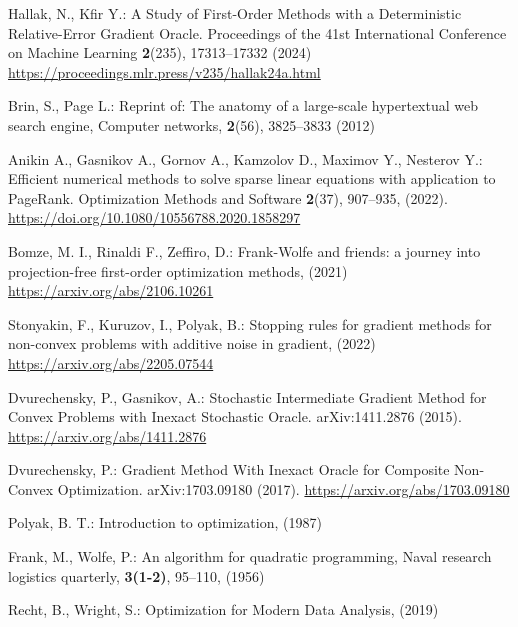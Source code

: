 \documentclass[runningheads, final]{llncs}
\begin{document}
%
%
%
% 
% 
%
\begin{thebibliography}{8}
    Hallak, N., Kfir Y.: A Study of First-Order Methods with a Deterministic Relative-Error Gradient Oracle. Proceedings of the 41st International
    Conference on Machine Learning \textbf{2}(235), 17313--17332 (2024)
    \url{https://proceedings.mlr.press/v235/hallak24a.html}

    Brin, S., Page L.: Reprint of: The anatomy of a large-scale hypertextual
    web search engine, Computer networks, \textbf{2}(56), 3825--3833 (2012)

    Anikin A., Gasnikov A., Gornov A., Kamzolov D., Maximov Y., Nesterov Y.: Efficient numerical methods to solve sparse linear equations
    with application to PageRank. Optimization Methods and Software
    \textbf{2}(37), 907--935, (2022).
    \url{https://doi.org/10.1080/10556788.2020.1858297}

    Bomze, M. I., Rinaldi F., Zeffiro, D.: Frank-Wolfe and friends: a journey
    into projection-free first-order optimization methods, (2021)
    \url{https://arxiv.org/abs/2106.10261}

    Stonyakin, F., Kuruzov, I., Polyak, B.: Stopping rules for gradient methods
    for non-convex problems with additive noise in gradient, (2022)
    \url{https://arxiv.org/abs/2205.07544}

    Dvurechensky, P., Gasnikov, A.: Stochastic Intermediate Gradient Method for
    Convex Problems with Inexact Stochastic Oracle.
    arXiv:1411.2876 (2015). \url{https://arxiv.org/abs/1411.2876}

    Dvurechensky, P.: Gradient Method With Inexact Oracle for Composite
    Non-Convex Optimization.
    arXiv:1703.09180 (2017). \url{https://arxiv.org/abs/1703.09180}

    Polyak, B. T.: Introduction to optimization, (1987)

    Frank, M., Wolfe, P.: An algorithm for quadratic programming, Naval research
    logistics quarterly, \textbf{3(1-2)}, 95--110, (1956)

    Recht, B., Wright, S.: Optimization for Modern Data Analysis, (2019)
\end{thebibliography}
\end{document}
